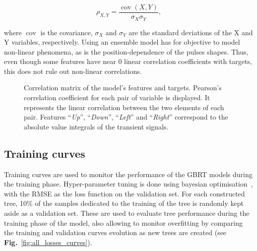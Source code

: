 \begin{equation}
    \rho_{X,Y}={\frac {\operatorname {cov} (X,Y)}{\sigma _{X}\sigma _{Y}}},
\end{equation}

\noindent where $\operatorname{cov}$ is the covariance, $\sigma_X$ and $\sigma_Y$ are the standard deviations of the X and Y variables, respectively.
Using an ensemble model has for objective to model non-linear phenomena, as is the position-dependence of the pulses shapes. Thus, even though some features have near 0 linear correlation coefficients with targets, this does not rule out non-linear correlations.

\begin{figure}
\centering
{}
\caption{Correlation matrix of the model's features and targets. Pearson's correlation coefficient for each pair of variable is displayed. It represents the linear correlation between the two elements of each pair. Features ``\textit{Up}'', ``\textit{Down}'', ``\textit{Left}'' and ``\textit{Right}'' correspond to the absolute value integrals of the transient signals.}
\label{fig:corr_matrix}
\end{figure}

\subsection{Training curves}
Training curves are used to monitor the performance of the GBRT models during the training phase. Hyper-parameter tuning is done using bayesian optimisation~\cite{Akiba2019}, with the RMSE as the loss function on the validation set. For each constructed tree, 10\% of the samples dedicated to the training of the tree is randomly kept aside as a validation set. These are used to evaluate tree performance during the training phase of the model, also allowing to monitor overfitting by comparing the training and validation curves evolution as new trees are created (see \textbf{Fig.}~\ref{fig:all_losses_curves}). 

